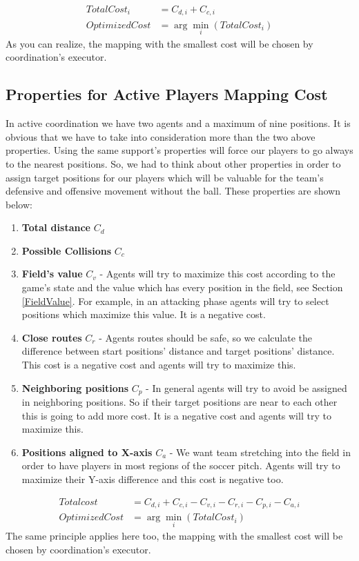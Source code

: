 \begin{align*}
TotalCost_{i} &= C_{d,i}+C_{c,i}\\
Optimized Cost &= \arg\min_{i}(TotalCost_{i})
\end{align*}
As you can realize, the mapping with the smallest cost will be chosen by coordination's executor.


\subsection{Properties for Active Players Mapping Cost}
In active coordination we have two agents and a maximum of nine positions. It is obvious that we have to take into consideration more than the two above properties. Using the same support's properties will force our players to go always to the nearest positions. So, we had to think about other properties in order to assign target positions for our players which will be valuable for the team's defensive and offensive movement without the ball. These properties are shown below:
\begin{enumerate}
\item \textbf{Total distance }$C_{d}$
\item \textbf{Possible Collisions }$C_{c}$
\item \textbf{Field's value }$C_{v}$ - Agents will try to maximize this cost according to the game's state and the value which has every position in the field, see Section \ref{FieldValue}. For example, in an attacking phase agents will try to select positions which maximize this value. It is a negative cost.
\item \textbf{Close routes }$C_{r}$ - Agents routes should be safe, so we calculate the difference between start positions' distance and target positions' distance. This cost is a negative cost and agents will try to maximize this.
\item \textbf{Neighboring positions }$C_{p}$ - In general agents will try to avoid be assigned in neighboring positions. So if their target positions are near to each other this is going to add more cost. It is a negative cost and agents will try to maximize this.
\item \textbf{Positions aligned to X-axis }$C_{a}$ - We want team stretching into the field in order to have players in most regions of the soccer pitch. Agents will try to maximize their Y-axis difference and this cost is negative too. 
\end{enumerate}
\begin{align*}
Total cost &= C_{d,i}+C_{c,i}-C_{v,i}-C_{r,i}-C_{p,i}-C_{a,i}\\
Optimized Cost &= \arg\min_{i}(TotalCost_{i})
\end{align*}
The same principle applies here too, the mapping with the smallest cost will be chosen by coordination's executor.



